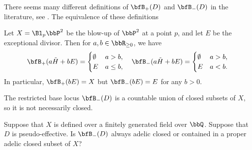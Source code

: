   \begin{remark}
    There seems many different definitions of $\bfB_+(D)$ and $\bfB_-(D)$ in the literature, see \cite{Birkar-2017-augmented-base-locus,Ein-Lazarsfeld-Mustața-Nakamaye-Popa-2006-asymptotic-invariants-base-loci}.
    The equivalence of these definitions 
  \end{remark}

  \begin{example}
    Let $X = \Bl_p \bbP^2$ be the blow-up of $\bbP^2$ at a point $p$, and let $E$ be the exceptional divisor.
    Then for $a,b \in \bbR_{\geq 0}$, we have
    \[ \bfB_+(a\tilde{H} + bE) = \begin{cases}
      \emptyset & a > b, \\
      E & a \leq b,
    \end{cases} \quad \bfB_-(a\tilde{H} + bE) = \begin{cases}
      \emptyset & a > b, \\
      E & a < b.
    \end{cases} \]
    In particular, $\bfB_+(bE) = X$ but $\bfB_-(bE) = E$ for any $b > 0$.
     \Yang{}
  \end{example}

  \begin{remark}
    The restricted base locus $\bfB_-(D)$ is a countable union of closed subsets of $X$, so it is not necessarily closed.
  \end{remark}

  \begin{question}
    Suppose that $X$ is defined over a finitely generated field over $\bbQ$.
    Suppose that $D$ is pseudo-effective.
    Is $\bfB_-(D)$ always adelic closed or contained in a proper adelic closed subset of $X$?
     \Yang{}
  \end{question}

  \begin{example}
    \Yang{}
  \end{example}

